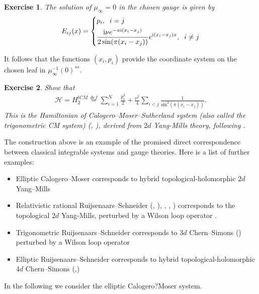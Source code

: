\documentclass[12pt]{article}
\newtheorem{exer}{Exercise}[section]
\numberwithin{equation}{section}
\theoremstyle{definition}
\newcommand {\ii} {\mathrm{i}}
\begin{document}
\begin{exer}\normalfont
    The solution of $\mu_{\infty} = 0$ in the chosen gauge is given by
\begin{align*}
E_{ij}(x) = 
\begin{dcases}
      p_{i}, \;\;i = j \\
     \frac{{\ii} \nu e^{-\pi {\ii} (x_i - x_j)}}{2 \sin (\pi (x_i - x_j))} e^{{\ii} (x_i - x_j) x}, \;\;i \neq j
\end{dcases}
\end{align*}
\end{exer}
It follows that the functions $(x_i, p_i)$ provide the coordinate system on the chosen leaf in $\mu_{\infty}^{-1}(0)^{ss}$.
\begin{exer}\normalfont
    Show that
    \begin{align*}
        \mathcal{H} = H_{2}^{tCM} \stackrel{def}{=} \sum\limits_{i = 1}^{N} \frac{p_i^2}{2} + \frac{\nu^2}{4} \sum\limits_{i < j} \frac{1}{\mathrm{sin}^{2}(\pi (x_i - x_j))}.
    \end{align*}
    This is the Hamiltonian of Calogero--Moser--Sutherland system (also called the trigonometric CM system) (\cite{Sutherland1971}, \cite{Moser1975}), derived from $2d$ Yang-Mills theory, following \cite{Gorsky:1993pe}.
\end{exer}
The construction above is an example of the promised direct correspondence between classical integrable systems and gauge theories. Here is a list of further examples:
\begin{itemize}[label=\raisebox{0.25ex}{\tiny$\bullet$}]
    \item 
    Elliptic Calogero--Moser corresponds to hybrid topological-holomorphic $2d$ Yang--Mills
    
    \item
    Relativistic rational Ruijsenaars--Schneider (\cite{Ruijsenaars:1986vq}, \cite{Ruijsenaars:1986pp}),
    \cite{Ruijsenaars:1988pv},
      \cite{RuijSim1990},
    \cite{Ruijsenaars:1994gc})
    corresponds to the topological $2d$ Yang-Mills, perturbed by a Wilson loop operator \cite{Fock:1999ae}. 
    
    \item 
    Trigonometric Ruijsenaars--Schneider corresponds to $3d$ Chern--Simons (\cite{Witten:1988hc})
    perturbed by a Wilson loop operator \cite{Gorsky:1993dq}
    
    \item 
    Elliptic Ruijsenaars--Schneider corresponds to hybrid topological-holomorphic $4d$ Chern--Simons (\cite{Nekrasov1996},\cite{costello2013})
\end{itemize}
In the following we consider the elliptic Calogero?Moser system.
\end{document}
